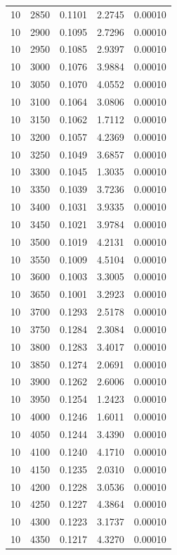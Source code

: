 \begin{longtable}{ccccc}
    10 & 2850 & 0.1101 & 2.2745 & 0.00010 \\
    10 & 2900 & 0.1095 & 2.7296 & 0.00010 \\
    10 & 2950 & 0.1085 & 2.9397 & 0.00010 \\
    10 & 3000 & 0.1076 & 3.9884 & 0.00010 \\
    10 & 3050 & 0.1070 & 4.0552 & 0.00010 \\
    10 & 3100 & 0.1064 & 3.0806 & 0.00010 \\
    10 & 3150 & 0.1062 & 1.7112 & 0.00010 \\
    10 & 3200 & 0.1057 & 4.2369 & 0.00010 \\
    10 & 3250 & 0.1049 & 3.6857 & 0.00010 \\
    10 & 3300 & 0.1045 & 1.3035 & 0.00010 \\
    10 & 3350 & 0.1039 & 3.7236 & 0.00010 \\
    10 & 3400 & 0.1031 & 3.9335 & 0.00010 \\
    10 & 3450 & 0.1021 & 3.9784 & 0.00010 \\
    10 & 3500 & 0.1019 & 4.2131 & 0.00010 \\
    10 & 3550 & 0.1009 & 4.5104 & 0.00010 \\
    10 & 3600 & 0.1003 & 3.3005 & 0.00010 \\
    10 & 3650 & 0.1001 & 3.2923 & 0.00010 \\
    10 & 3700 & 0.1293 & 2.5178 & 0.00010 \\
    10 & 3750 & 0.1284 & 2.3084 & 0.00010 \\
    10 & 3800 & 0.1283 & 3.4017 & 0.00010 \\
    10 & 3850 & 0.1274 & 2.0691 & 0.00010 \\
    10 & 3900 & 0.1262 & 2.6006 & 0.00010 \\
    10 & 3950 & 0.1254 & 1.2423 & 0.00010 \\
    10 & 4000 & 0.1246 & 1.6011 & 0.00010 \\
    10 & 4050 & 0.1244 & 3.4390 & 0.00010 \\
    10 & 4100 & 0.1240 & 4.1710 & 0.00010 \\
    10 & 4150 & 0.1235 & 2.0310 & 0.00010 \\
    10 & 4200 & 0.1228 & 3.0536 & 0.00010 \\
    10 & 4250 & 0.1227 & 4.3864 & 0.00010 \\
    10 & 4300 & 0.1223 & 3.1737 & 0.00010 \\
    10 & 4350 & 0.1217 & 4.3270 & 0.00010 \\

\end{longtable}
